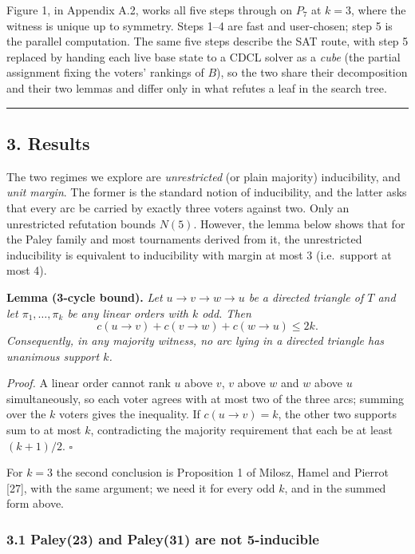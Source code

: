 \documentclass[
]{article}
\begin{document}
Figure 1, in Appendix A.2, works all five steps through on \(P_7\) at
\(k = 3\), where the witness is unique up to symmetry. Steps 1--4 are
fast and user-chosen; step 5 is the parallel computation. The same five
steps describe the SAT route, with step 5 replaced by handing each live
base state to a CDCL solver as a \emph{cube} (the partial assignment
fixing the voters' rankings of \(B\)), so the two share their
decomposition and their two lemmas and differ only in what refutes a
leaf in the search tree.

\begin{center}\rule{0.5\linewidth}{0.5pt}\end{center}

\subsection{3. Results}\label{results}

The two regimes we explore are \emph{unrestricted} (or plain majority)
inducibility, and \emph{unit margin}. The former is the standard notion
of inducibility, and the latter asks that every arc be carried by
exactly three voters against two. Only an unrestricted refutation bounds
\(N(5)\). However, the lemma below shows that for the Paley family and
most tournaments derived from it, the unrestricted inducibility is
equivalent to inducibility with margin at most \(3\) (i.e.~support at
most 4).

\textbf{Lemma (3-cycle bound).} \emph{Let \(u \to v \to w \to u\) be a
directed triangle of \(T\) and let \(\pi_1,\dots,\pi_k\) be any linear
orders with \(k\) odd. Then}
\[c(u\to v) + c(v \to w) + c(w \to u) \le 2k.\] \emph{Consequently, in
any majority witness, no arc lying in a directed triangle has unanimous
support \(k\).}

\emph{Proof.} A linear order cannot rank \(u\) above \(v\), \(v\) above
\(w\) and \(w\) above \(u\) simultaneously, so each voter agrees with at
most two of the three arcs; summing over the \(k\) voters gives the
inequality. If \(c(u \to v) = k\), the other two supports sum to at most
\(k\), contradicting the majority requirement that each be at least
\((k+1)/2\). \(\square\)

For \(k = 3\) the second conclusion is Proposition 1 of Milosz, Hamel
and Pierrot {[}27{]}, with the same argument; we need it for every odd
\(k\), and in the summed form above.

\subsubsection{3.1 Paley(23) and Paley(31) are not
5-inducible}\label{paley23-and-paley31-are-not-5-inducible}
\end{document}
